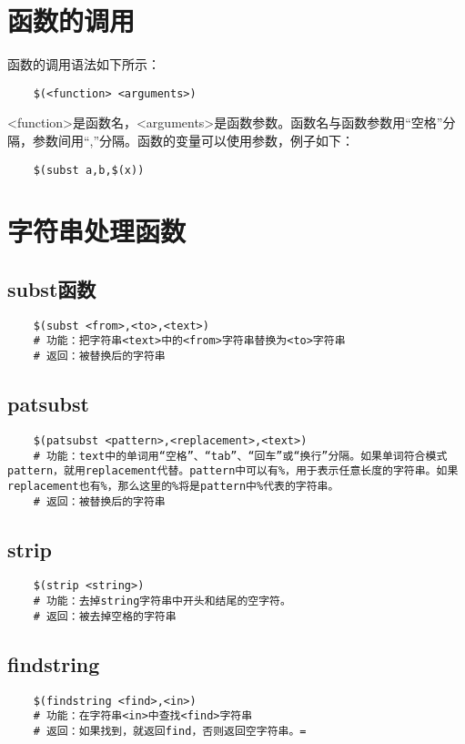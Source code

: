 \documentclass[a4paper,left=2.5cm,right=2.5cm,11pt]{article}
\begin{document}
\tableofcontents

\clearpage

\section{函数的调用}
	函数的调用语法如下所示：
	\begin{lstlisting}
	$(<function> <arguments>)
	\end{lstlisting}

	<function>是函数名，<arguments>是函数参数。函数名与函数参数用“空格”分隔，参数间用“,”分隔。函数的变量可以使用参数，例子如下：
	\begin{lstlisting}
	$(subst a,b,$(x))
	\end{lstlisting}

\section{字符串处理函数}
\subsection{subst函数}
	\begin{lstlisting}
	$(subst <from>,<to>,<text>)
	# 功能：把字符串<text>中的<from>字符串替换为<to>字符串
	# 返回：被替换后的字符串
	\end{lstlisting}

\subsection{patsubst}
	\begin{lstlisting}
	$(patsubst <pattern>,<replacement>,<text>)
	# 功能：text中的单词用“空格”、“tab”、“回车”或“换行”分隔。如果单词符合模式pattern，就用replacement代替。pattern中可以有%，用于表示任意长度的字符串。如果replacement也有%，那么这里的%将是pattern中%代表的字符串。
	# 返回：被替换后的字符串
	\end{lstlisting}

\subsection{strip}
	\begin{lstlisting}
	$(strip <string>)
	# 功能：去掉string字符串中开头和结尾的空字符。
	# 返回：被去掉空格的字符串
	\end{lstlisting}

\subsection{findstring}
	\begin{lstlisting}
	$(findstring <find>,<in>)
	# 功能：在字符串<in>中查找<find>字符串
	# 返回：如果找到，就返回find，否则返回空字符串。=
	\end{lstlisting}
\end{document}
